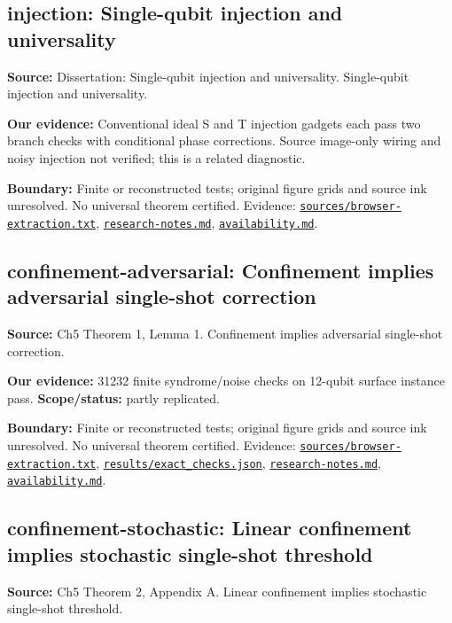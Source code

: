 \documentclass[11pt]{article}
\begin{document}
\subsection{injection: Single-qubit injection and universality}
\label{claim:injection}
\textbf{Source:} Dissertation: Single-qubit injection and universality. Single-qubit injection and universality.

\textbf{Our evidence:} Conventional ideal S and T injection gadgets each pass two branch checks with conditional phase corrections. Source image-only wiring and noisy injection not verified; this is a related diagnostic.

\textbf{Boundary:} Finite or reconstructed tests; original figure grids and source ink unresolved. No universal theorem certified. Evidence: \href{https://github.com/alectionary/vibe-math/blob/master/formalization/quintavalle-hgp/sources/browser-extraction.txt}{\nolinkurl{sources/browser-extraction.txt}}, \href{https://github.com/alectionary/vibe-math/blob/master/formalization/quintavalle-hgp/research-notes.md}{\nolinkurl{research-notes.md}}, \href{https://github.com/alectionary/vibe-math/blob/master/formalization/quintavalle-hgp/availability.md}{\nolinkurl{availability.md}}.
\subsection{confinement-adversarial: Confinement implies adversarial single-shot correction}
\label{claim:confinement-adversarial}
\textbf{Source:} Ch5 Theorem 1, Lemma 1. Confinement implies adversarial single-shot correction.

\textbf{Our evidence:} 31232 finite syndrome/noise checks on 12-qubit surface instance pass. \textbf{Scope/status:} partly replicated.

\textbf{Boundary:} Finite or reconstructed tests; original figure grids and source ink unresolved. No universal theorem certified. Evidence: \href{https://github.com/alectionary/vibe-math/blob/master/formalization/quintavalle-hgp/sources/browser-extraction.txt}{\nolinkurl{sources/browser-extraction.txt}}, \href{https://github.com/alectionary/vibe-math/blob/master/formalization/quintavalle-hgp/results/exact_checks.json}{\nolinkurl{results/exact_checks.json}}, \href{https://github.com/alectionary/vibe-math/blob/master/formalization/quintavalle-hgp/research-notes.md}{\nolinkurl{research-notes.md}}, \href{https://github.com/alectionary/vibe-math/blob/master/formalization/quintavalle-hgp/availability.md}{\nolinkurl{availability.md}}.
\subsection{confinement-stochastic: Linear confinement implies stochastic single-shot threshold}
\label{claim:confinement-stochastic}
\textbf{Source:} Ch5 Theorem 2, Appendix A. Linear confinement implies stochastic single-shot threshold.
\end{document}
